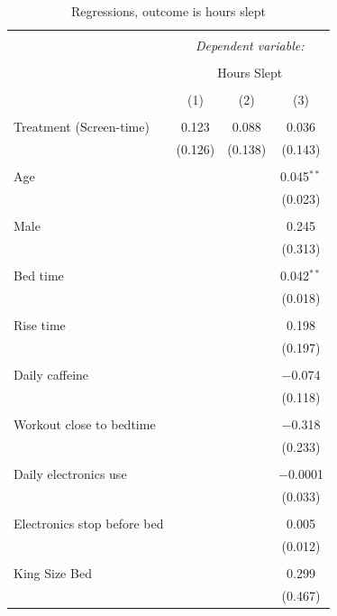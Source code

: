 \documentclass[12pt,]{article}
\begin{document}
\begin{table}[!htbp] \centering 
  \caption{\label{tab:hours_regressions} Regressions, outcome is hours slept} 
  \label{} 
\begin{tabular}{@{\extracolsep{5pt}}lccc} 
\\[-1.8ex]\hline 
\hline \\[-1.8ex] 
 & \multicolumn{3}{c}{\textit{Dependent variable:}} \\ 
\cline{2-4} 
\\[-1.8ex] & \multicolumn{3}{c}{Hours Slept} \\ 
\\[-1.8ex] & (1) & (2) & (3)\\ 
\hline \\[-1.8ex] 
 Treatment (Screen-time) & 0.123 & 0.088 & 0.036 \\ 
  & (0.126) & (0.138) & (0.143) \\ 
  & & & \\ 
 Age &  &  & 0.045$^{**}$ \\ 
  &  &  & (0.023) \\ 
  & & & \\ 
 Male &  &  & 0.245 \\ 
  &  &  & (0.313) \\ 
  & & & \\ 
 Bed time &  &  & 0.042$^{**}$ \\ 
  &  &  & (0.018) \\ 
  & & & \\ 
 Rise time &  &  & 0.198 \\ 
  &  &  & (0.197) \\ 
  & & & \\ 
 Daily caffeine &  &  & $-$0.074 \\ 
  &  &  & (0.118) \\ 
  & & & \\ 
 Workout close to bedtime &  &  & $-$0.318 \\ 
  &  &  & (0.233) \\ 
  & & & \\ 
 Daily electronics use &  &  & $-$0.0001 \\ 
  &  &  & (0.033) \\ 
  & & & \\ 
 Electronics stop before bed &  &  & 0.005 \\ 
  &  &  & (0.012) \\ 
  & & & \\ 
 King Size Bed &  &  & 0.299 \\ 
  &  &  & (0.467) \\ 

\end{tabular}
\end{table}
\end{document}
